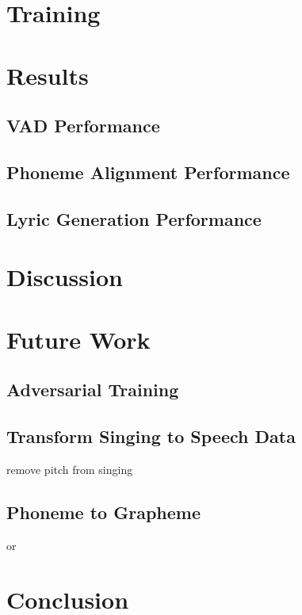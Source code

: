 \documentclass[letterpaper, 12pt]{article}
\begin{document}
\begin{multicols*}{2}
\section{Training}



\section{Results}

\subsection{VAD Performance}

\subsection{Phoneme Alignment Performance}

\subsection{Lyric Generation Performance}

\section{Discussion}

\section{Future Work}
\subsection{Adversarial Training}
\subsection{Transform Singing to Speech Data}
remove pitch from singing
\subsection{Phoneme to Grapheme}
\citep{G2P} or \citep{P2G}


\section{Conclusion}
\citep{pyannote}
\printbibliography

\end{multicols*}
\end{document}
